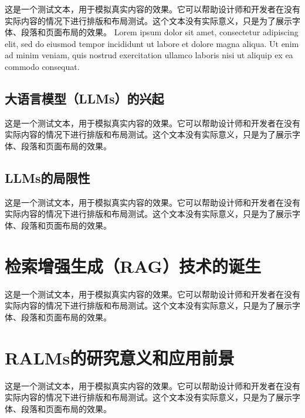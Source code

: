 这是一个测试文本，用于模拟真实内容的效果。它可以帮助设计师和开发者在没有实际内容的情况下进行排版和布局测试。这个文本没有实际意义，只是为了展示字体、段落和页面布局的效果。
Lorem ipsum dolor sit amet, consectetur adipiscing elit, sed do eiusmod tempor incididunt ut labore et dolore magna aliqua. Ut enim ad minim veniam, quis nostrud exercitation ullamco laboris nisi ut aliquip ex ea commodo consequat.


\subsection{大语言模型（LLMs）的兴起}
这是一个测试文本，用于模拟真实内容的效果。它可以帮助设计师和开发者在没有实际内容的情况下进行排版和布局测试。这个文本没有实际意义，只是为了展示字体、段落和页面布局的效果。

\subsection{LLMs的局限性}
这是一个测试文本，用于模拟真实内容的效果。它可以帮助设计师和开发者在没有实际内容的情况下进行排版和布局测试。这个文本没有实际意义，只是为了展示字体、段落和页面布局的效果。

\section{检索增强生成（RAG）技术的诞生}
这是一个测试文本，用于模拟真实内容的效果。它可以帮助设计师和开发者在没有实际内容的情况下进行排版和布局测试。这个文本没有实际意义，只是为了展示字体、段落和页面布局的效果。

\section{RALMs的研究意义和应用前景}
这是一个测试文本，用于模拟真实内容的效果。它可以帮助设计师和开发者在没有实际内容的情况下进行排版和布局测试。这个文本没有实际意义，只是为了展示字体、段落和页面布局的效果。
